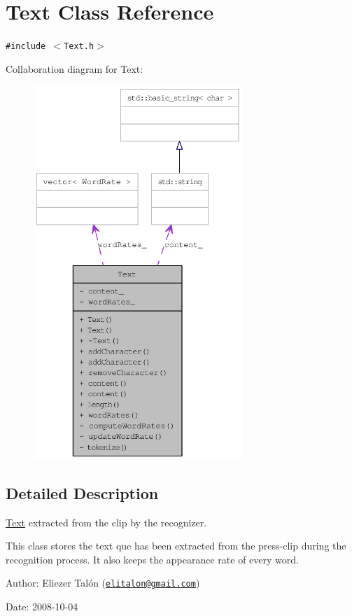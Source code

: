 \hypertarget{class_text}{
\section{Text Class Reference}
\label{class_text}
}
{\tt \#include $<$Text.h$>$}

Collaboration diagram for Text:\nopagebreak
\begin{figure}[H]
\begin{center}
\leavevmode
\includegraphics[height=400pt]{class_text__coll__graph}
\end{center}
\end{figure}


\subsection{Detailed Description}
\hyperlink{class_text}{Text} extracted from the clip by the recognizer. 

This class stores the text que has been extracted from the press-clip during the recognition process. It also keeps the appearance rate of every word.

\begin{Desc}
\item[Author:]Eliezer Talón (\href{mailto:elitalon@gmail.com}{\tt elitalon@gmail.com}) \end{Desc}
\begin{Desc}
\item[Date:]2008-10-04 \end{Desc}


